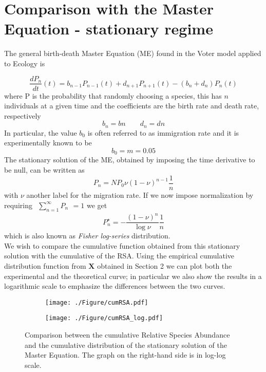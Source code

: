 \documentclass[a4paper,11pt]{article}
\begin{document}
\section{Comparison with the Master Equation - stationary regime}
The general birth-death Master Equation (ME) found in the Voter model applied to Ecology is 

    \begin{equation}
        \frac{dP_n}{dt}(t) = b_{n-1} P_{n-1}(t) + d_{n+1} P_{n+1}(t) - (b_n + d_n) P_n(t)
    \end{equation}
where P is the probability that randomly choosing a species, this has $n$ individuals at a given time and the coefficients are the birth rate and death rate, respectively
    \begin{equation}
        b_n= bn \qquad d_n=dn
    \end{equation}
In particular, the value $b_0$ is often referred to as immigration rate and it is experimentally known to be
    \begin{equation}
        b_0=m=0.05
    \end{equation}
The stationary solution of the ME, obtained by imposing the time derivative to be null, can be written as 
    \begin{equation}
        P_n = NP_0 \nu (1-\nu)^{n-1}\frac{1}{n}
    \end{equation}
with $\nu$ another label for the migration rate. If we now impose normalization by requiring $\begin{matrix} \sum_{n=1}^\infty P_n \end{matrix} =1$ we get
    \begin{equation}
        P_n^{\star} = - \frac{(1-\nu)^n}{\log \nu} \frac{1}{n}
    \end{equation}
which is also known as \emph{Fisher log-series} distribution.
\\
We wish to compare the cumulative function obtained from this stationary solution with the cumulative of the RSA.
Using the empirical cumulative distribution function from $\mathbf{X}$ obtained in Section 2 we can plot both the experimental and the theoretical curve; in particular we also show the results in a logarithmic scale to emphasize the differences between the two curves.

\begin{figure}[htp]
  \centering
  \begin{subfigure}{.49\textwidth}
    \centering
    \texttt{[image: ./Figure/cumRSA.pdf]}  
  \label{fig:cumRSAnormal}
  \end{subfigure}%
  \begin{subfigure}{.49\textwidth}
  \centering
  \texttt{[image: ./Figure/cumRSA\_log.pdf]}  
  \label{fig:cumRSAlog}
  \end{subfigure}
  \caption{Comparison between the cumulative Relative Species Abundance and the cumulative distribution of the stationary solution of the Master Equation. The graph on the right-hand side is in log-log scale.}
  \label{fig:cumRSA}
\end{figure}
\end{document}
